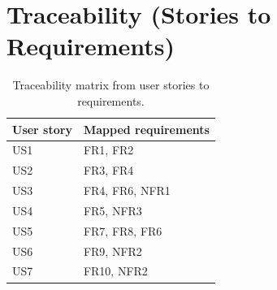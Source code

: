 \section{Traceability (Stories to Requirements)}
\label{sec:traceability}

\begin{table}[H]
\centering
\begin{tabularx}{\textwidth}{|l|X|}
\hline
\textbf{User story} & \textbf{Mapped requirements} \\
\hline
US1 & FR1, FR2 \\
\hline
US2 & FR3, FR4 \\
\hline
US3 & FR4, FR6, NFR1 \\
\hline
US4 & FR5, NFR3 \\
\hline
US5 & FR7, FR8, FR6 \\
\hline
US6 & FR9, NFR2 \\
\hline
US7 & FR10, NFR2 \\
\hline
\end{tabularx}
\caption{Traceability matrix from user stories to requirements.}
\label{tab:traceability}
\end{table}

